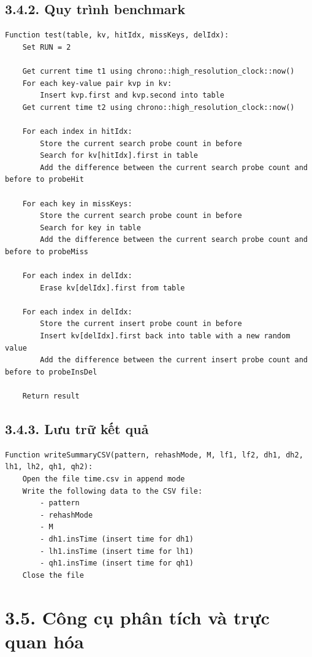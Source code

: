 \documentclass[12pt,a4paper]{report}
\begin{document}
\subsection*{3.4.2. Quy trình benchmark}
\begin{lstlisting}[style=numbered]
Function test(table, kv, hitIdx, missKeys, delIdx):
    Set RUN = 2

    Get current time t1 using chrono::high_resolution_clock::now()
    For each key-value pair kvp in kv:
        Insert kvp.first and kvp.second into table
    Get current time t2 using chrono::high_resolution_clock::now()

    For each index in hitIdx:
        Store the current search probe count in before
        Search for kv[hitIdx].first in table
        Add the difference between the current search probe count and before to probeHit

    For each key in missKeys:
        Store the current search probe count in before
        Search for key in table
        Add the difference between the current search probe count and before to probeMiss

    For each index in delIdx:
        Erase kv[delIdx].first from table

    For each index in delIdx:
        Store the current insert probe count in before
        Insert kv[delIdx].first back into table with a new random value
        Add the difference between the current insert probe count and before to probeInsDel

    Return result
\end{lstlisting}

\subsection*{3.4.3. Lưu trữ kết quả}
\begin{lstlisting}[style=numbered]
Function writeSummaryCSV(pattern, rehashMode, M, lf1, lf2, dh1, dh2, lh1, lh2, qh1, qh2):
    Open the file time.csv in append mode
    Write the following data to the CSV file:
        - pattern
        - rehashMode
        - M
        - dh1.insTime (insert time for dh1)
        - lh1.insTime (insert time for lh1)
        - qh1.insTime (insert time for qh1)
    Close the file
\end{lstlisting}

\section*{3.5. Công cụ phân tích và trực quan hóa}
\end{document}
